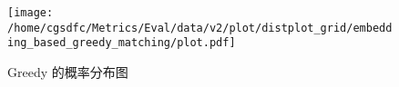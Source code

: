 \begin{figure}[H]%
\centering%
\texttt{[image: /home/cgsdfc/Metrics/Eval/data/v2/plot/distplot\_grid/embedding\_based\_greedy\_matching/plot.pdf]}%
\caption{Greedy 的概率分布图}%
\label{fig:Greedydist}%
\end{figure}